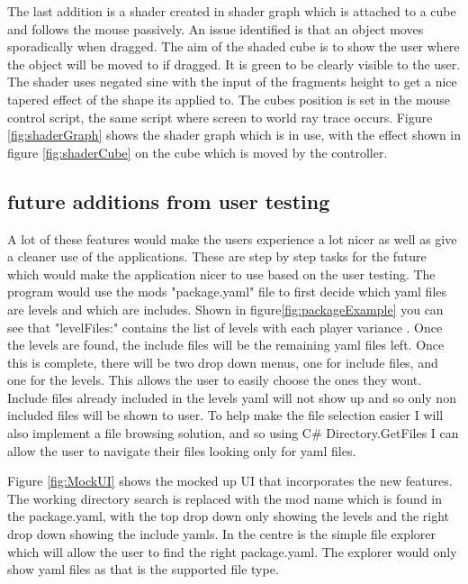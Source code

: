 The last addition is a shader created in shader graph which is attached to a cube and follows the mouse passively. An issue identified is that an object moves sporadically when dragged. The aim of the shaded cube is to show the user where the object will be moved to if dragged. It is green to be clearly visible to the user.
The shader uses negated sine with the input of the fragments height to get a nice tapered effect of the shape its applied to. The cubes position is set in the mouse control script, the same script where screen to world ray trace occurs.
Figure \ref{fig:shaderGraph} shows the shader graph which is in use, with the effect shown in figure \ref{fig:shaderCube} on the cube which is moved by the controller.


\subsection{future additions from user testing}
A lot of these features would make the users experience a lot nicer as well as give a cleaner use of the applications. These are step by step tasks for the future which would make the application nicer to use based on the user testing.
The program would use the mods "package.yaml" file to first decide which yaml files are levels and which are includes. Shown in figure\ref{fig:packageExample} you can see that "levelFiles:" contains the list of levels with each player variance . Once the levels are found, the include files will be the remaining yaml files left. Once this is complete, there will be two drop down menus, one for include files, and one for the levels. This allows the user to easily choose the ones they wont. Include files already included in the levels yaml will not show up and so only non included files will be shown to user.
To help make the file selection easier I will also implement a file browsing solution, and so using C\# Directory.GetFiles I can allow the user to navigate their files looking only for yaml files.




Figure \ref{fig:MockUI} shows the mocked up UI that incorporates the new features. The working directory search is replaced with the mod name which is found in the package.yaml, with the top drop down only showing the levels and the right drop down showing the include yamls. In the centre is the simple file explorer which will allow the user to find the right package.yaml. The explorer would only show yaml files as that is the supported file type.


